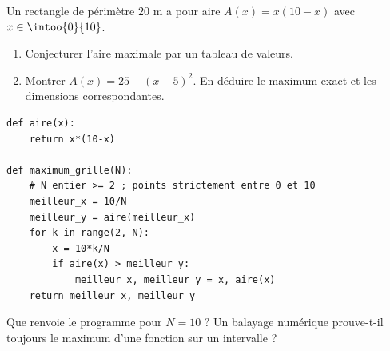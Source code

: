 \begin{example}Un rectangle de périmètre $20$ m a pour aire $A(x)=x(10-x)$ avec $x\in\intoo{0}{10}$.
\begin{enumerate}\item Conjecturer l'aire maximale par un tableau de valeurs.\item Montrer $A(x)=25-(x-5)^2$. En déduire le maximum exact et les dimensions correspondantes.\end{enumerate}\end{example}
\begin{lstlisting}
def aire(x):
    return x*(10-x)

def maximum_grille(N):
    # N entier >= 2 ; points strictement entre 0 et 10
    meilleur_x = 10/N
    meilleur_y = aire(meilleur_x)
    for k in range(2, N):
        x = 10*k/N
        if aire(x) > meilleur_y:
            meilleur_x, meilleur_y = x, aire(x)
    return meilleur_x, meilleur_y
\end{lstlisting}
\begin{example}Que renvoie le programme pour $N=10$ ? Un balayage numérique prouve-t-il toujours le maximum d'une fonction sur un intervalle ?\end{example}
